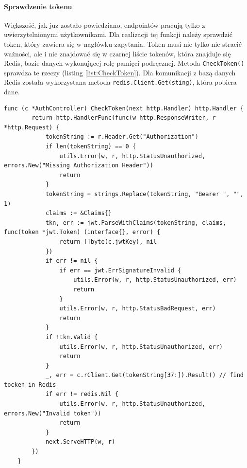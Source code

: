 \paragraph{Sprawdzenie tokenu\newline}
Większość, jak juz zostało powiedziano, endpointów pracują tylko z uwierzytelnionymi użytkownikami. Dla realizacji tej funkcji należy sprawdzić token, który zawiera się w nagłówku zapytania.
Token musi nie tylko nie stracić ważności, ale i nie znajdować się w czarnej liście tokenów, która znajduje się Redis, bazie danych wykonującej rolę pamięci podręcznej.
Metoda \texttt{CheckToken()} sprawdza te rzeczy (listing \ref{list:CheckToken}). Dla komunikacji z bazą danych Redis została wykorzystana metoda \texttt{redis.Client.Get(sting)}, która pobiera dane.
\begin{lstlisting}[label=list:CheckToken,caption=Walidacja JWT tokenu,basicstyle=\tiny\ttfamily]
    func (c *AuthController) CheckToken(next http.Handler) http.Handler {
        return http.HandlerFunc(func(w http.ResponseWriter, r *http.Request) {
            tokenString := r.Header.Get("Authorization")
            if len(tokenString) == 0 {
                utils.Error(w, r, http.StatusUnauthorized, errors.New("Missing Authorization Header"))
                return
            }
            tokenString = strings.Replace(tokenString, "Bearer ", "", 1)
            claims := &Claims{}
            tkn, err := jwt.ParseWithClaims(tokenString, claims, func(token *jwt.Token) (interface{}, error) {
                return []byte(c.jwtKey), nil
            })
            if err != nil {
                if err == jwt.ErrSignatureInvalid {
                    utils.Error(w, r, http.StatusUnauthorized, err)
                    return
                }
                utils.Error(w, r, http.StatusBadRequest, err)
                return
            }
            if !tkn.Valid {
                utils.Error(w, r, http.StatusUnauthorized, err)
                return
            }
            _, err = c.rClient.Get(tokenString[37:]).Result() // find tocken in Redis
            if err != redis.Nil {
                utils.Error(w, r, http.StatusUnauthorized, errors.New("Invalid token"))
                return
            }
            next.ServeHTTP(w, r)
        })
    }
\end{lstlisting}

